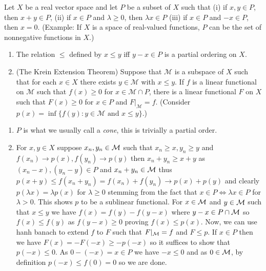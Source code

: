 \documentclass[12pt,a4paper]{article}
\begin{document}
\begin{problem}\label{prob:5-26}
Let $X$ be a real vector space and let $P$ be a subset of $X$ such that (i) if $x,y \in P$, then $x+y \in P$, (ii) if $x \in P$ and $\lambda \ge 0$, then $\lambda x \in P$ (iii) if $x \in P$ and $-x \in P$, then $x=0$. (Example: If $X$ is a space of real-valued functions, $P$ can be the set of nonnegative functions in $X$.)
\begin{enumerate}[label=\alph*.]
\item The relation $\le$ defined by $x \le y$ iff $y-x \in P$ is a partial ordering on $X$.
\item (The Krein Extension Theorem) Suppose that $\mathcal{M}$ is a subspace of $X$ such that for each $x \in X$ there exists $y \in \mathcal{M}$ with $x \le y$. If $f$ is a linear functional on $\mathcal{M}$ such that $f(x) \ge 0$ for $x \in \mathcal{M} \cap P$, there is a linear functional $F$ on $X$ such that $F(x) \ge 0$ for $x \in P$ and $F|_\mathcal{M} = f$. (Consider $p(x) = \inf\{f(y) : y \in \mathcal{M} \text{ and } x \le y\}$.)
\end{enumerate}
\end{problem}
\begin{solution}
    \begin{enumerate}[label=\alph*.]
        \item $P$ is what we usually call a \textit{cone}, this is trivially a partial order. 
        \item For $x,y\in X$ suppose $x_n,y_n\in\mathcal{M}$ such that $x_n\geq x,y_n\geq y$ and $f(x_n)\to p(x),f(y_n)\to p(y)$ then $x_n+y_n\geq x+y$ as $(x_n-x),(y_n-y)\in P$ and $x_n+y_n\in\mathcal{M}$ thus $p(x+y)\leq f(x_n+y_n)=f(x_n)+f(y_n)\to p(x)+p(y)$ and clearly $p(\lambda x)=\lambda p(x)$ for $\lambda\geq 0$ stemming from the fact that $x\in P\iff\lambda x\in P$ for $\lambda>0$. 
            This shows $p$ to be a sublinear functional. 
            For $x\in\mathcal{M}$ and $y\in\mathcal{M}$ such that $x\leq y$ we have $f(x)=f(y)-f(y-x)$ where $y-x\in P\cap\mathcal{M}$ so $f(x)\leq f(y)$ as $f(y-x)\geq 0$ proving $f(x)\leq p(x)$. 
            Now, we can use hanh banach to extend $f$ to $F$ such that $F|_{\mathcal{M}}=f$ and $F\leq p$. 
            If $x\in P$ then we have $F(x)=-F(-x)\geq-p(-x)$ so it suffices to show that $p(-x)\leq 0$. 
            As $0-(-x)=x\in P$ we have $-x\leq 0$ and as $0\in\mathcal{M}$, by definition $p(-x)\leq f(0)=0$ so we are done. 
    \end{enumerate}    
\end{solution}
\end{document}
